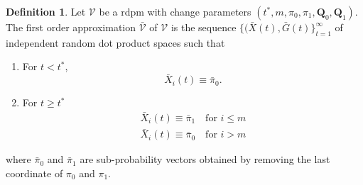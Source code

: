 \documentclass[draftcls]{IEEEtran}
\theoremstyle{definition}
\newtheorem{definition}{Definition}
\begin{document}
\begin{definition}
  \label{def:1}
  Let $\mathscr{V}$ be a rdpm with change parameters $(t^{*}, m,
  \pi_0, \pi_1, \mathbf{Q}_0, \mathbf{Q}_1)$. The first order approximation
  $\bar{\mathscr{V}}$ of $\mathscr{V}$ is the sequence $\{(\bar{X}(t),
  \bar{G}(t)\}_{t = 1}^{\infty}$ of independent random dot product
  spaces such that
 \begin{enumerate}
 \item For $t < t^{*}$,
   \begin{equation}
     \label{eq:5}
     \bar{X}_{i}(t) \equiv \bar{\pi}_0.
   \end{equation}
 \item For $t \geq t^{*}$
   \begin{gather*}
     \bar{X}_{i}(t) \equiv \bar{\pi}_1 \quad \text{for $i \leq m$} \\
     \bar{X}_{i}(t) \equiv \bar{\pi}_0 \quad \text{for $i > m$} 
   \end{gather*}
 \end{enumerate}
 where $\bar{\pi}_0$ and $\bar{\pi}_1$ are sub-probability vectors
 obtained by removing the last coordinate of $\pi_0$ and $\pi_1$. 
\end{definition}
\end{document}
